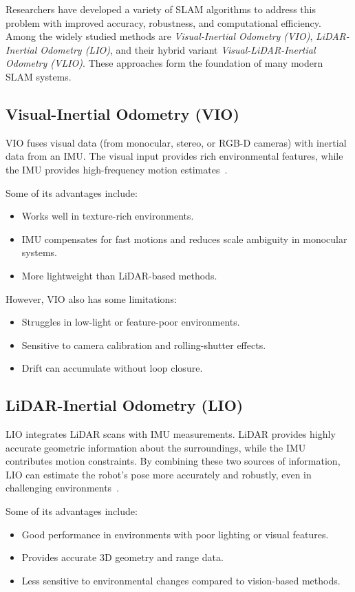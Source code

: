 \documentclass[english, bachelor, utf8]{base/thesis_telematics}
\begin{document}
Researchers have developed a variety of SLAM algorithms to address this problem with improved accuracy, robustness, and computational efficiency.
Among the widely studied methods are \textit{Visual-Inertial Odometry (VIO)}, \textit{LiDAR-Inertial Odometry (LIO)}, and their hybrid variant \textit{Visual-LiDAR-Inertial Odometry (VLIO)}. 
These approaches form the foundation of many modern SLAM systems.
\subsection{Visual-Inertial Odometry (VIO)}
VIO fuses visual data (from monocular, stereo, or RGB-D cameras) with inertial data from an IMU. 
The visual input provides rich environmental features, while the IMU provides high-frequency motion estimates~\cite{inertiallabs_vio_revolution,Survey_odometry}.

Some of its advantages include:
\begin{itemize}
    \item Works well in texture-rich environments.
    \item IMU compensates for fast motions and reduces scale ambiguity in monocular systems.
    \item More lightweight than LiDAR-based methods.
\end{itemize}

However, VIO also has some limitations:
\begin{itemize}
    \item Struggles in low-light or feature-poor environments.
    \item Sensitive to camera calibration and rolling-shutter effects.
    \item Drift can accumulate without loop closure.
\end{itemize}

\subsection{LiDAR-Inertial Odometry (LIO)}
LIO integrates LiDAR scans with IMU measurements. LiDAR provides highly accurate geometric information about the surroundings, while the IMU contributes motion constraints.
By combining these two sources of information, LIO can estimate the robot's pose more accurately and robustly, even in challenging environments~\cite{lee2024_lidar_odometry_survey,fastlio2}.

Some of its advantages include:
\begin{itemize}
    \item Good performance in environments with poor lighting or visual features.
    \item Provides accurate 3D geometry and range data.
    \item Less sensitive to environmental changes compared to vision-based methods.
\end{itemize}
\end{document}
